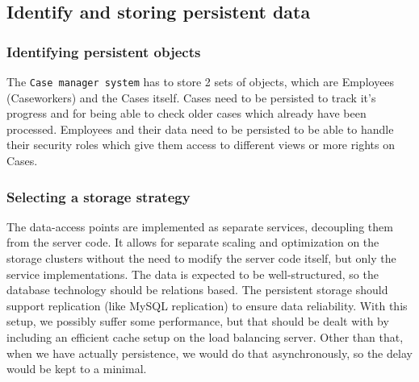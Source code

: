 \subsection{Identify and storing persistent data}

\subsubsection{Identifying persistent objects}
The \texttt{Case manager system} has to store 2 sets of objects, which are Employees (Caseworkers) and the Cases itself.
Cases need to be persisted to track it's progress and for being able to check older cases which already have been processed.
Employees and their data need to be persisted to be able to handle their security roles which give them access to different views or more rights on Cases.

\subsubsection{Selecting a storage strategy}
The data-access points are implemented as separate services, decoupling them from the server code. It allows for separate scaling and optimization on the storage clusters without the need to modify the server code itself, but only the service implementations. The data is expected to be well-structured, so the database technology should be relations based. The persistent storage should support replication (like MySQL replication) to ensure data reliability.
With this setup, we possibly suffer some performance, but that should be dealt with by including an efficient cache setup on the load balancing server. Other than that, when we have actually persistence, we would do that asynchronously, so the delay would be kept to a minimal.

